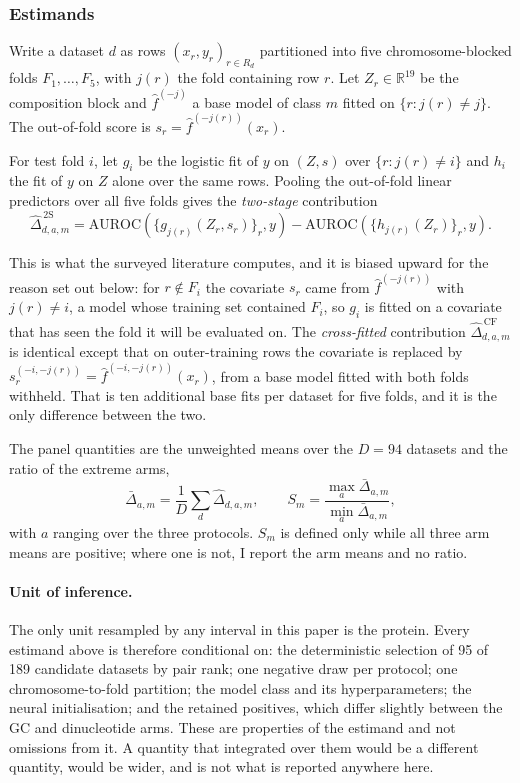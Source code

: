 \subsubsection*{Estimands}

Write a dataset $d$ as rows $(x_r, y_r)_{r \in R_d}$ partitioned into five chromosome-blocked
folds $F_1, \dots, F_5$, with $j(r)$ the fold containing row $r$. Let $Z_r \in \mathbb{R}^{19}$
be the composition block and $\hat{f}^{(-j)}$ a base model of class $m$ fitted on
$\{r : j(r) \neq j\}$. The out-of-fold score is $s_r = \hat{f}^{(-j(r))}(x_r)$.

For test fold $i$, let $g_i$ be the logistic fit of $y$ on $(Z, s)$ over $\{r : j(r) \neq i\}$
and $h_i$ the fit of $y$ on $Z$ alone over the same rows. Pooling the out-of-fold linear
predictors over all five folds gives the \emph{two-stage} contribution
\begin{equation*}
\widehat{\Delta}^{\,\mathrm{2S}}_{d,a,m}
= \mathrm{AUROC}\!\left(\{g_{j(r)}(Z_r, s_r)\}_{r}, y\right)
- \mathrm{AUROC}\!\left(\{h_{j(r)}(Z_r)\}_{r}, y\right).
\end{equation*}

This is what the surveyed literature computes, and it is biased upward for the reason set out
below: for $r \notin F_i$ the covariate $s_r$ came from $\hat{f}^{(-j(r))}$ with $j(r) \neq i$,
a model whose training set contained $F_i$, so $g_i$ is fitted on a covariate that has seen the
fold it will be evaluated on. The \emph{cross-fitted} contribution
$\widehat{\Delta}^{\,\mathrm{CF}}_{d,a,m}$ is identical except that on outer-training rows the
covariate is replaced by $s_r^{(-i,-j(r))} = \hat{f}^{(-i,-j(r))}(x_r)$, from a base model
fitted with both folds withheld. That is ten additional base fits per dataset for five folds,
and it is the only difference between the two.

The panel quantities are the unweighted means over the $D = 94$ datasets and the ratio of the
extreme arms,
\begin{equation*}
\bar{\Delta}_{a,m} = \frac{1}{D}\sum_{d} \widehat{\Delta}_{d,a,m},
\qquad
S_m = \frac{\max_a \bar{\Delta}_{a,m}}{\min_a \bar{\Delta}_{a,m}},
\end{equation*}
with $a$ ranging over the three protocols. $S_m$ is defined only while all three arm means are
positive; where one is not, I report the arm means and no ratio.

\paragraph{Unit of inference.} The only unit resampled by any interval in this paper is
the protein. Every estimand above is therefore conditional on: the deterministic selection of
95 of 189 candidate datasets by pair rank; one negative draw per protocol; one
chromosome-to-fold partition; the model class and its hyperparameters; the neural
initialisation; and the retained positives, which differ slightly between the GC and
dinucleotide arms. These are properties of the estimand and not omissions from it. A quantity
that integrated over them would be a different quantity, would be wider, and is not what is
reported anywhere here.

